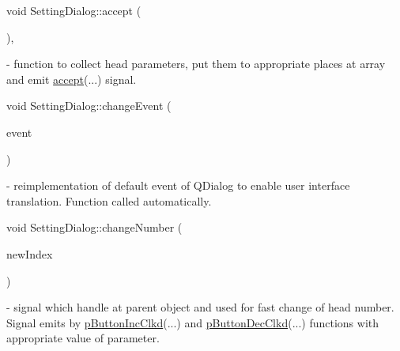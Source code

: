 \mbox{\label{classSettingDialog_ac5caf772c1ad7d7607a164ad7f6fe647}} 
{\footnotesize\ttfamily void Setting\+Dialog\+::\texorpdfstring{accept}{accept}\hspace{0.1cm} (\begin{DoxyParamCaption}{ }\end{DoxyParamCaption})\hspace{0.3cm}{\ttfamily [private]}, {\ttfamily [slot]}} - function to collect head parameters, put them to appropriate places at array and emit \hyperlink{classSettingDialog_abaf35d57bd061500e4d06c86bd9b7373}{accept}(...) signal.

\mbox{\label{classSettingDialog_a7aa0c7f2703bd6d208570eb7ed98e47b}} 
{\footnotesize\ttfamily void Setting\+Dialog\+::\texorpdfstring{change\+Event}{changeEvent} (\begin{DoxyParamCaption}\item[{Q\+Event $\ast$}]{event }\end{DoxyParamCaption})\hspace{0.3cm}{\ttfamily [protected]}}- reimplementation of default event of Q\+Dialog to enable user interface translation. Function called automatically.

\mbox{\label{classSettingDialog_aaec8f3ce53ff211c0d2a3ebace6a4120}} 
{\footnotesize\ttfamily void Setting\+Dialog\+::\texorpdfstring{change\+Number}{changeNumber} (\begin{DoxyParamCaption}\item[{int}]{new\+Index }\end{DoxyParamCaption})\hspace{0.3cm}{\ttfamily [signal]}} - signal which handle at parent object and used for fast change of head number. Signal emits by \hyperlink{classSettingDialog_a586eff422c5c347ee5ff3ffe71b5ba97}{p\+Button\+Inc\+Clkd}(...) and \hyperlink{classSettingDialog_a87b4aca2d528b1b8e943983efc9d9506}{p\+Button\+Dec\+Clkd}(...) functions with appropriate value of parameter.

